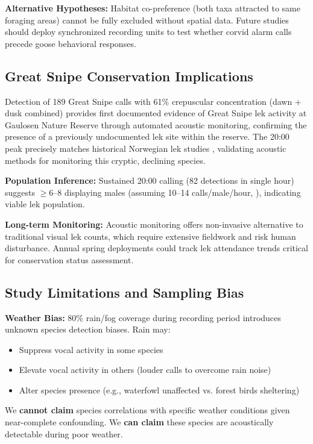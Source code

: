 \documentclass[twocolumn]{article}
\begin{document}
\textbf{Alternative Hypotheses:} Habitat co-preference (both taxa attracted to same foraging areas) cannot be fully excluded without spatial data. Future studies should deploy synchronized recording units to test whether corvid alarm calls precede goose behavioral responses.

\subsection{Great Snipe Conservation Implications}

Detection of 189 Great Snipe calls with 61\% crepuscular concentration (dawn + dusk combined) provides first documented evidence of Great Snipe lek activity at Gaulosen Nature Reserve through automated acoustic monitoring, confirming the presence of a previously undocumented lek site within the reserve. The 20:00 peak precisely matches historical Norwegian lek studies \citep{Kålås1995}, validating acoustic methods for monitoring this cryptic, declining species.

\textbf{Population Inference:} Sustained 20:00 calling (82 detections in single hour) suggests $\geq$6--8 displaying males (assuming 10--14 calls/male/hour, \citet{Höglund2020}), indicating viable lek population.

\textbf{Long-term Monitoring:} Acoustic monitoring offers non-invasive alternative to traditional visual lek counts, which require extensive fieldwork and risk human disturbance. Annual spring deployments could track lek attendance trends critical for conservation status assessment.

\subsection{Study Limitations and Sampling Bias}

\textbf{Weather Bias:} 80\% rain/fog coverage during recording period introduces unknown species detection biases. Rain may:
\begin{itemize}
\item Suppress vocal activity in some species
\item Elevate vocal activity in others (louder calls to overcome rain noise)
\item Alter species presence (e.g., waterfowl unaffected vs. forest birds sheltering)
\end{itemize}

We \textbf{cannot claim} species correlations with specific weather conditions given near-complete confounding. We \textbf{can claim} these species are acoustically detectable during poor weather.
\end{document}
